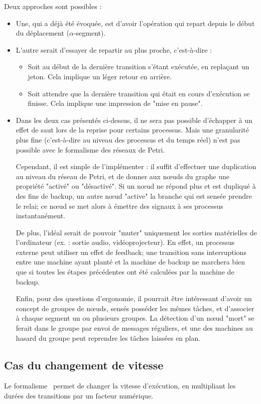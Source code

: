 Deux approches sont possibles :
\begin{itemize}
\item Une, qui a déjà été évoquée, est d'avoir l'opération qui repart depuis le début du déplacement ($\alpha$-segment).
\item L'autre serait d'essayer de repartir au plus proche, c'est-à-dire :  
\begin{itemize}
\item Soit au début de la dernière transition s'étant exécutée, en replaçant un jeton. Cela implique un léger retour en arrière.
\item Soit attendre que la dernière transition qui était en cours d'exécution se finisse. Cela implique une impression de "mise en pause".
\end{itemize}

\item Dans les deux cas présentés ci-dessus, il ne sera pas possible d'échapper à un effet de saut lors de la reprise pour certains processus. Mais une granularité plus fine (c'est-à-dire au niveau des processus et du temps réel) n'est pas possible avec le formalisme des réseaux de Petri.

Cependant, il est simple de l'implémenter : il suffit d'effectuer une duplication au niveau du réseau de Petri, et de donner aux nœuds du graphe une propriété "activé" ou "désactivé". Si un nœud ne répond plus et est dupliqué à des fins de backup, un autre nœud "active" la branche qui est sensée prendre le relai; ce nœud se met alors à émettre des signaux à ses processus instantanément.

De plus, l'idéal serait de pouvoir "muter" uniquement les sorties matérielles de l'ordinateur (ex. : sortie audio, vidéoprojecteur). En effet, un processus externe peut utiliser un effet de feedback; une transition sans interruptions entre une machine ayant planté et la machine de backup ne marchera bien que si toutes les étapes précédentes ont été calculées par la machine de backup.

Enfin, pour des questions d'ergonomie, il pourrait être intéressant d'avoir un concept de groupes de nœuds, sensés posséder les mêmes tâches, et d'associer à chaque segment un ou plusieurs groupes. La détection d'un nœud "mort" se ferait dans le groupe par envoi de messages réguliers, et une des machines au hasard du groupe peut reprendre les tâches laissées en plan.
\end{itemize}

\subsection{Cas du changement de vitesse}
Le formalisme~\cite{allombert2010virage} permet de changer la vitesse d'exécution, en multipliant les durées des transitions par un facteur numérique.

